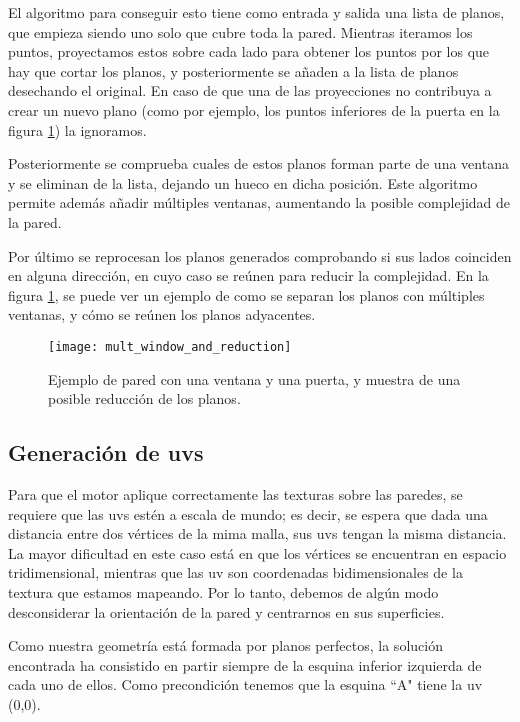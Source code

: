 El algoritmo para conseguir esto tiene como entrada y salida una lista de planos, que empieza siendo uno solo que cubre toda la pared. Mientras iteramos los puntos, proyectamos estos sobre cada lado para obtener los puntos por los que hay que cortar los planos, y posteriormente se añaden a la lista de planos desechando el original. En caso de que una de las proyecciones no contribuya a crear un nuevo plano (como por ejemplo, los puntos inferiores de la puerta en la figura \ref{fig:mult_and_red_windows}) la ignoramos.

Posteriormente se comprueba cuales de estos planos forman parte de una ventana y se eliminan de la lista, dejando un hueco en dicha posición. Este algoritmo permite además añadir múltiples ventanas, aumentando la posible complejidad de la pared.

Por último se reprocesan los planos generados comprobando si sus lados coinciden en alguna dirección, en cuyo caso se reúnen para reducir la complejidad. En la figura \ref{fig:mult_and_red_windows}, se puede ver un ejemplo de como se separan los planos con múltiples ventanas, y cómo se reúnen los planos adyacentes.

\begin{figure}[H]
    \centering
    \texttt{[image: mult\_window\_and\_reduction]}
    \caption{Ejemplo de pared con una ventana y una puerta, y muestra de una posible reducción de los planos.}
    \label{fig:mult_and_red_windows}
\end{figure}

\subsection{Generación de uvs}
Para que el motor aplique correctamente las texturas sobre las paredes, se requiere que las uvs estén a escala de mundo; es decir, se espera que dada una distancia entre dos vértices de la mima malla, sus uvs tengan la misma distancia. La mayor dificultad en este caso está en que los vértices se encuentran en espacio tridimensional, mientras que las uv son coordenadas bidimensionales de la textura que estamos mapeando. Por lo tanto, debemos de algún modo desconsiderar la orientación de la pared y centrarnos en sus superficies.

Como nuestra geometría está formada por planos perfectos, la solución encontrada ha consistido en partir siempre de la esquina inferior izquierda de cada uno de ellos. Como precondición tenemos que la esquina ``A" tiene la uv (0,0).

